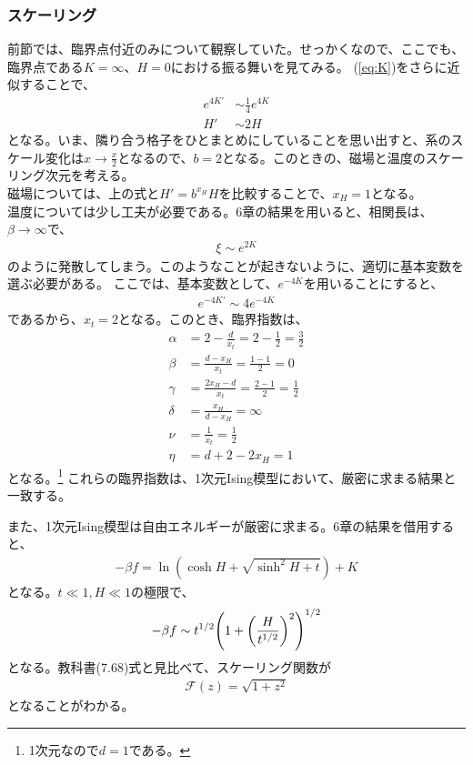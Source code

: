 \documentclass[a4paper,11pt]{jsarticle}
\numberwithin{equation}{section}
\begin{document}
\subsubsection{スケーリング}
前節では、臨界点付近のみについて観察していた。せっかくなので、ここでも、臨界点である$K = \infty $、$H = 0$における振る舞いを見てみる。
(\ref{eq:K})をさらに近似することで、
\begin{align}
    e^{4K'} &\sim \frac{1}{4}e^{4K}\\
    H' &\sim 2H
\end{align}
となる。いま、隣り合う格子をひとまとめにしていることを思い出すと、系のスケール変化は$x \to \frac{x}{2}$となるので、$b = 2$となる。このときの、磁場と温度のスケーリング次元を考える。\\
磁場については、上の式と$H' = b^{x_H}H$を比較することで、$x_H = 1$となる。\\
温度については少し工夫が必要である。6章の結果を用いると、相関長は、$\beta \to \infty$で、
\begin{align}
    \xi \sim e^{2K}
\end{align}
のように発散してしまう。このようなことが起きないように、適切に基本変数を選ぶ必要がある。
ここでは、基本変数として、$e^{-4K}$を用いることにすると、
\begin{align}
    e^{-4K'} \sim 4e^{-4K}
\end{align}
であるから、$x_t = 2$となる。このとき、臨界指数は、
\begin{align}
    \alpha &= 2- \frac{d}{x_t} = 2- \frac{1}{2} = \frac{3}{2}\\
    \beta &= \frac{d - x_H}{x_t} = \frac{1-1}{2} = 0\\
    \gamma &= \frac{2x_H - d}{x_t} = \frac{2-1}{2} = \frac{1}{2}\\
    \delta &= \frac{x_H}{d-x_H}  = \infty\\
    \nu &= \frac{1}{x_t} = \frac{1}{2}\\
    \eta &= d + 2 - 2x_H = 1
\end{align}
となる。\footnote{1次元なので$d=1$である。}
これらの臨界指数は、1次元Ising模型において、厳密に求まる結果と一致する。

また、1次元Ising模型は自由エネルギーが厳密に求まる。6章の結果を借用すると、
\begin{align}
    -\beta f = \ln(\cosh H + \sqrt{\sinh^2 H + t}) + K
\end{align}
となる。$t\ll 1, H\ll 1$の極限で、
\begin{align}
    -\beta f \sim t^{1/2}\qty(1 + \qty(\frac{H}{t^{1/2}})^2)^{1/2}
\end{align}
となる。教科書(7.68)式と見比べて、スケーリング関数が
\begin{align}
    \mathcal{F}(z) = \sqrt{1+z^2}
\end{align}
となることがわかる。
\end{document}

